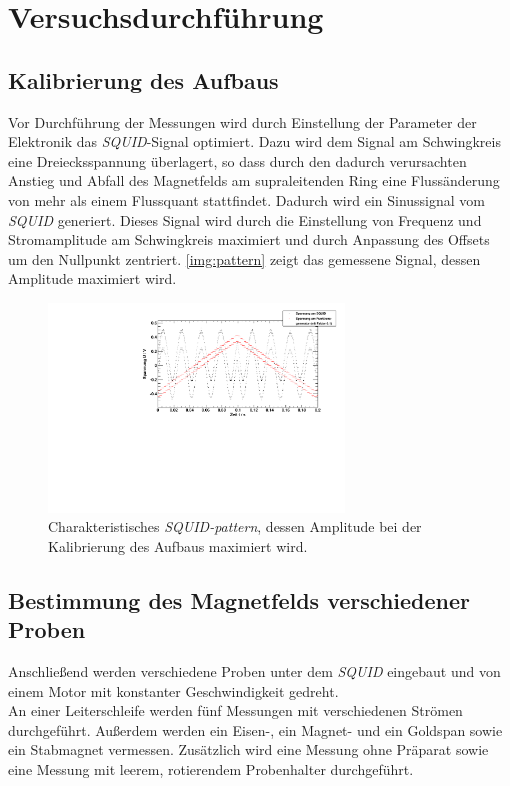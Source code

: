 \section{Versuchsdurchführung}

\subsection*{Kalibrierung des Aufbaus}

Vor Durchführung der Messungen wird durch Einstellung der Parameter der Elektronik das \emph{SQUID}-Signal
optimiert. Dazu wird dem Signal am Schwingkreis eine Dreiecksspannung überlagert,
so dass durch den dadurch verursachten Anstieg und Abfall des Magnetfelds am supraleitenden Ring
eine Flussänderung von mehr als einem Flussquant stattfindet. Dadurch wird ein Sinussignal vom \emph{SQUID}
generiert. Dieses Signal wird durch die Einstellung von Frequenz und Stromamplitude am Schwingkreis
maximiert und durch Anpassung des Offsets um den Nullpunkt zentriert.
\autoref{img:pattern} zeigt das gemessene Signal, dessen Amplitude maximiert wird.

\begin{figure}[H]
\begin{center}
  \includegraphics[width=0.7\textwidth]{../img/pattern.pdf}
  \caption{Charakteristisches \emph{SQUID-pattern}, dessen Amplitude bei der Kalibrierung des Aufbaus
  maximiert wird.}
  \label{img:pattern}
\end{center}
\end{figure}


\subsection*{Bestimmung des Magnetfelds verschiedener Proben}
Anschließend werden verschiedene Proben unter dem \emph{SQUID} eingebaut und von einem Motor
mit konstanter Geschwindigkeit gedreht.\\
An einer Leiterschleife werden fünf Messungen mit verschiedenen Strömen durchgeführt.
Außerdem werden ein Eisen-, ein Magnet- und ein Goldspan sowie ein Stabmagnet vermessen.
Zusätzlich wird eine Messung ohne Präparat sowie eine Messung mit leerem, rotierendem Probenhalter durchgeführt.



